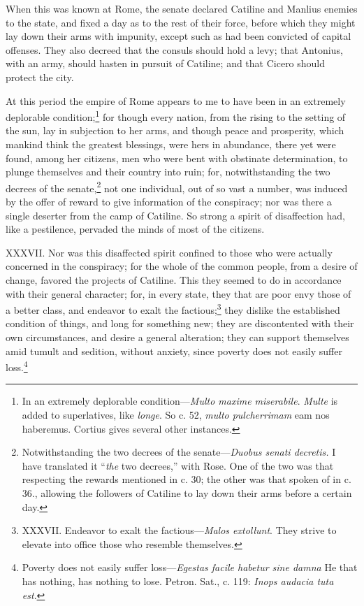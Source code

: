 When this was known at Rome, the senate declared Catiline and Manlius
enemies to the state, and fixed a day as to the rest of their force,
before which they might lay down their arms with impunity, except such
as had been convicted of capital offenses. They also decreed that the
consuls should hold a levy; that Antonius, with an army, should hasten
in pursuit of Catiline; and that Cicero should protect the city.

At this period the empire of Rome appears to me to have been in an
extremely deplorable condition;\footnote{In an extremely deplorable condition—\emph{Multo maxime miserabile}.
\emph{Multe} is added to superlatives, like \emph{longe}. So c. 52, \emph{multo
pulcherrimam} eam nos haberemus. Cortius gives several other instances.} for though every nation, from the
rising to the setting of the sun, lay in subjection to her arms, and
though peace and prosperity, which mankind think the greatest
blessings, were hers in abundance, there yet were found, among her
citizens, men who were bent with obstinate determination, to plunge
themselves and their country into ruin; for, notwithstanding the two
decrees of the senate,\footnote{Notwithstanding the two decrees of the senate—\emph{Duobus senati
decretis.} I have translated it ``\emph{the} two decrees,'' with Rose.
One of the two was that respecting the rewards mentioned in c. 30; the
other was that spoken of in c. 36., allowing the followers of Catiline
to lay down their arms before a certain day.} not one individual, out of so vast a
number, was induced by the offer of reward to give information of the
conspiracy; nor was there a single deserter from the camp of Catiline.
So strong a spirit of disaffection had, like a pestilence, pervaded
the minds of most of the citizens.

XXXVII. Nor was this disaffected spirit confined to those who were
actually concerned in the conspiracy; for the whole of the common
people, from a desire of change, favored the projects of Catiline.
This they seemed to do in accordance with their general character;
for, in every state, they that are poor envy those of a better class,
and endeavor to exalt the factious;\footnote{XXXVII. Endeavor to exalt the factious—\emph{Malos extollunt}.
They strive to elevate into office those who resemble themselves.} they dislike the established
condition of things, and long for something new; they are discontented
with their own circumstances, and desire a general alteration; they
can support themselves amid tumult and sedition, without anxiety,
since poverty does not easily suffer loss.\footnote{Poverty does not easily suffer loss—\emph{Egestas facile habetur
sine damna} He that has nothing, has nothing to lose. Petron.
Sat., c. 119: \emph{Inops audacia tuta est}.}

